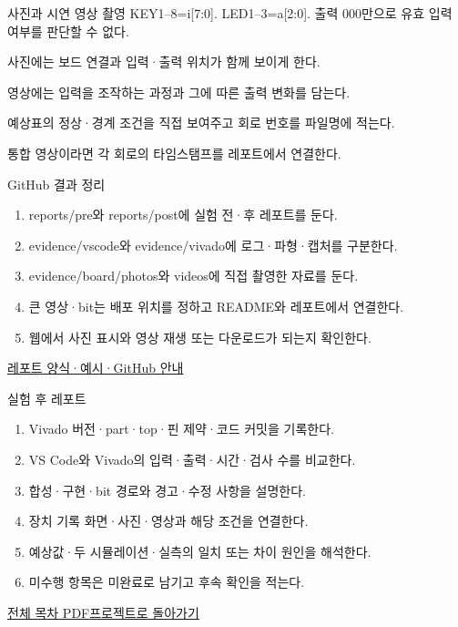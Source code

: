 \begin{frame}{사진과 시연 영상 촬영}\relax
\small
KEY1–8=i[7:0]. LED1–3=a[2:0]. 출력 000만으로 유효 입력 여부를 판단할 수 없다.\par\vspace{0.22cm}사진에는 보드 연결과 입력·출력 위치가 함께 보이게 한다.\par\vspace{0.22cm}영상에는 입력을 조작하는 과정과 그에 따른 출력 변화를 담는다.\par\vspace{0.22cm}예상표의 정상·경계 조건을 직접 보여주고 회로 번호를 파일명에 적는다.\par\vspace{0.22cm}통합 영상이라면 각 회로의 타임스탬프를 레포트에서 연결한다.\par
\end{frame}

\begin{frame}{GitHub 결과 정리}\relax
\small
\begin{enumerate}\setlength{\itemsep}{0.22cm}
\item reports/pre와 reports/post에 실험 전·후 레포트를 둔다.
\item evidence/vscode와 evidence/vivado에 로그·파형·캡처를 구분한다.
\item evidence/board/photos와 videos에 직접 촬영한 자료를 둔다.
\item 큰 영상·bit는 배포 위치를 정하고 README와 레포트에서 연결한다.
\item 웹에서 사진 표시와 영상 재생 또는 다운로드가 되는지 확인한다.
\end{enumerate}
\href{https://github.com/Glaysia/ece2_26_2_2/blob/daily/0910/example/fpga_projects_hdl/LAB1/docs/reports.md}{레포트 양식·예시·GitHub 안내}
\end{frame}

\begin{frame}{실험 후 레포트}\relax
\small
\begin{enumerate}\setlength{\itemsep}{0.22cm}
\item Vivado 버전·part·top·핀 제약·코드 커밋을 기록한다.
\item VS Code와 Vivado의 입력·출력·시간·검사 수를 비교한다.
\item 합성·구현·bit 경로와 경고·수정 사항을 설명한다.
\item 장치 기록 화면·사진·영상과 해당 조건을 연결한다.
\item 예상값·두 시뮬레이션·실측의 일치 또는 차이 원인을 해석한다.
\item 미수행 항목은 미완료로 남기고 후속 확인을 적는다.
\end{enumerate}
\href{04.LAB1_00_CONTENTS.pdf}{전체 목차 PDF}\quad\href{https://github.com/Glaysia/fpga-lab-example-legacy-08-encoder8to3/tree/7f88377d78cf60cece52021e238a9ecc62d70a0b}{프로젝트로 돌아가기}
\end{frame}
\endgroup

